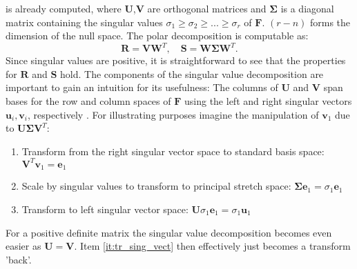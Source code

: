 \documentclass[m,times]{cgMA}
\begin{document}
is already computed, where $\boldsymbol{U}$,$\boldsymbol{V}$ are orthogonal matrices and $\boldsymbol{\Sigma}$ is a diagonal matrix containing the singular values $\sigma_1 \geq \sigma_2 \geq ... \geq \sigma_r$ of $\boldsymbol{F}$. $(r-n)$ forms the dimension of the null space. The polar decomposition is computable as:
\begin{equation}
  \boldsymbol{R} = \boldsymbol{V} \boldsymbol{W} ^ { T }, \quad \boldsymbol{S} = \boldsymbol{W} \boldsymbol{\Sigma} \boldsymbol{W} ^ { T }.
\end{equation}
Since singular values are positive, it is straightforward to see that the properties for $\boldsymbol{R}$ and $\boldsymbol{S}$ hold.
The components of the singular value decomposition are important to gain an intuition for its usefulness: The columns of $\boldsymbol{U}$ and $\boldsymbol{V}$ span bases for the row and column spaces of $\boldsymbol{F}$ using the left and right singular vectors $\boldsymbol{u}_i,\boldsymbol{v}_i$, respectively \cite{MIT:SVD}. For illustrating purposes imagine the manipulation of $\boldsymbol{v}_1$ due to $\boldsymbol{U\Sigma V}^T$:
\begin{enumerate}
  \item Transform from the right singular vector space to standard basis space: $\boldsymbol{V}^T\boldsymbol{v}_1 = \boldsymbol{e}_1$
  \item Scale by singular values to transform to principal stretch space: $\boldsymbol{\Sigma} \boldsymbol{e}_1 = \sigma_1 \boldsymbol{e}_1$
  \item \label{it:tr_sing_vect} Transform to left singular vector space: $\boldsymbol{U}\sigma_1\boldsymbol{e}_1 = \sigma_1 \boldsymbol{u}_{1}$
\end{enumerate}
For a positive definite matrix the singular value decomposition becomes even easier as $\boldsymbol{U}=\boldsymbol{V}$. Item \ref{it:tr_sing_vect} then effectively just becomes a transform 'back'.
\end{document}
